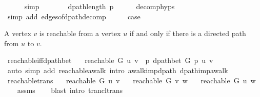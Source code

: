\begin{isabellebody}
\ \ \ \ \isamarkupfalse%
\ simp\isanewline
\ \ \isamarkupfalse%
\ \isamarkupfalse%
\ {\isachardoublequoteopen}{\isachardot}{\kern0pt}{\isachardot}{\kern0pt}{\isachardot}{\kern0pt}\ {\isacharequal}{\kern0pt}\ dpath{\isacharunderscore}{\kern0pt}length\ p{\isachardoublequoteclose}\isanewline
\ \ \ \ \isamarkupfalse%
\ decomp{\isachardot}{\kern0pt}hyps\isanewline
\ \ \ \ \isamarkupfalse%
\ {\isacharparenleft}{\kern0pt}simp\ add{\isacharcolon}{\kern0pt}\ edges{\isacharunderscore}{\kern0pt}of{\isacharunderscore}{\kern0pt}dpath{\isacharunderscore}{\kern0pt}decomp{\isacharparenright}{\kern0pt}\isanewline
\ \ \isamarkupfalse%
\ \isamarkupfalse%
\ {\isacharquery}{\kern0pt}case\isanewline
\ \ \ \ \isacommand{{\isachardot}{\kern0pt}}\isamarkupfalse%
\isanewline
{}\isamarkupfalse%
%
\endisatagproof
{\isafoldproof}%
%
\isadelimproof
%
\endisadelimproof
%
\begin{isamarkuptext}%
A vertex $v$ is reachable from a vertex $u$ if and only if there is a directed path from $u$ to $v$.%
\end{isamarkuptext}\isamarkuptrue%
\isamarkupfalse%
\ reachable{\isacharunderscore}{\kern0pt}iff{\isacharunderscore}{\kern0pt}dpath{\isacharunderscore}{\kern0pt}bet{\isacharcolon}{\kern0pt}\isanewline
\ \ \ {\isachardoublequoteopen}reachable\ G\ u\ v\ {\isasymlongleftrightarrow}\ {\isacharparenleft}{\kern0pt}{\isasymexists}p{\isachardot}{\kern0pt}\ dpath{\isacharunderscore}{\kern0pt}bet\ G\ p\ u\ v{\isacharparenright}{\kern0pt}{\isachardoublequoteclose}\isanewline
%
\isadelimproof
\ \ %
\endisadelimproof
%
\isatagproof
{}\isamarkupfalse%
\ {\isacharparenleft}{\kern0pt}auto\ simp\ add{\isacharcolon}{\kern0pt}\ reachable{\isacharunderscore}{\kern0pt}awalk\ intro{\isacharcolon}{\kern0pt}\ awalk{\isacharunderscore}{\kern0pt}imp{\isacharunderscore}{\kern0pt}dpath\ dpath{\isacharunderscore}{\kern0pt}imp{\isacharunderscore}{\kern0pt}awalk{\isacharparenright}{\kern0pt}%
\endisatagproof
{\isafoldproof}%
%
\isadelimproof
\isanewline
%
\endisadelimproof
\isanewline
{}\isamarkupfalse%
\ reachable{\isacharunderscore}{\kern0pt}trans{\isacharcolon}{\kern0pt}\isanewline
\ \ \ {\isachardoublequoteopen}reachable\ G\ u\ v{\isachardoublequoteclose}\isanewline
\ \ \ {\isachardoublequoteopen}reachable\ G\ v\ w{\isachardoublequoteclose}\isanewline
\ \ \ {\isachardoublequoteopen}reachable\ G\ u\ w{\isachardoublequoteclose}\isanewline
%
\isadelimproof
\ \ %
\endisadelimproof
%
\isatagproof
{}\isamarkupfalse%
\ assms\isanewline
\ \ \isamarkupfalse%
\ {\isacharparenleft}{\kern0pt}blast\ intro{\isacharcolon}{\kern0pt}\ trancl{\isacharunderscore}{\kern0pt}trans{\isacharparenright}{\kern0pt}%
\endisatagproof
{\isafoldproof}%
%
\isadelimproof
\isanewline
%
\endisadelimproof
%
\isadelimtheory
\isanewline
%
\endisadelimtheory
%
\isatagtheory
{}\isamarkupfalse%
%
\endisatagtheory
{\isafoldtheory}%
%
\isadelimtheory
%
\endisadelimtheory
%
\end{isabellebody}%
